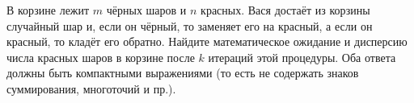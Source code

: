 \documentclass{article}
\begin{document}
В корзине лежит $m$ чёрных шаров и $n$ красных. Вася достаёт из корзины случайный шар и, если он чёрный, то заменяет его на красный, а если он красный, то кладёт его обратно.
Найдите математическое ожидание и дисперсию числа красных шаров в корзине после $k$ итераций этой процедуры. Оба ответа должны быть компактными выражениями (то есть не содержать 
знаков суммирования, многоточий и пр.).
\end{document}
